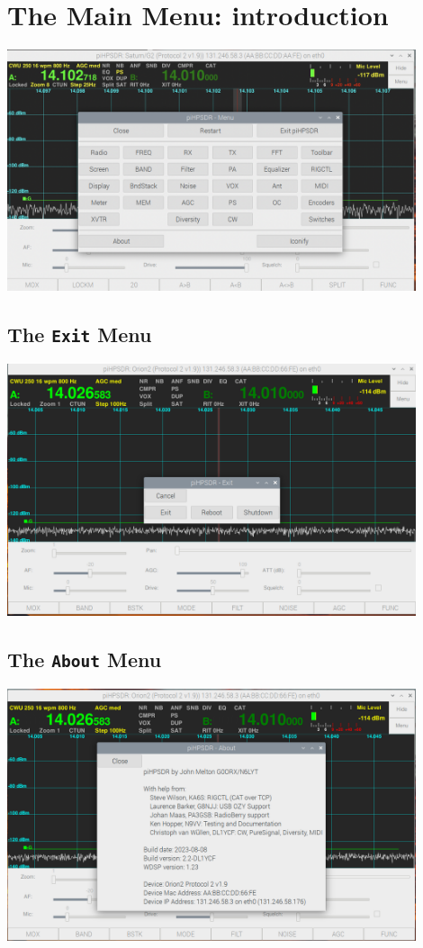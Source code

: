 \documentclass[12pt]{book}
\begin{document}
\chapter{The Main Menu: introduction}

\begin{center}
\includegraphics[width=12cm]{MainMenu.png}
\end{center}

\section{The \texttt{Exit} Menu}
\begin{center}
\includegraphics[width=12cm]{ExitMenu.png}
\end{center}

\section{The \texttt{About} Menu}
\begin{center}
\includegraphics[width=12cm]{AboutMenu.png}
\end{center}
\end{document}
